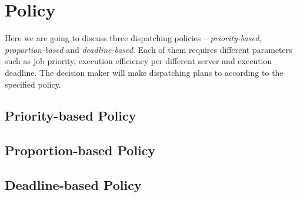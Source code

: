 \chapter{Policy}

Here we are going to discuss three dispatching policies --
\emph{priority-based}, \emph{proportion-based} and
\emph{deadline-based}.
Each of them requires different parameters such as job priority,
execution efficiency per different server and execution deadline.
The decision maker will make dispatching plans to according to the
specified policy.

\section{Priority-based Policy}

\section{Proportion-based Policy}

\section{Deadline-based Policy}

